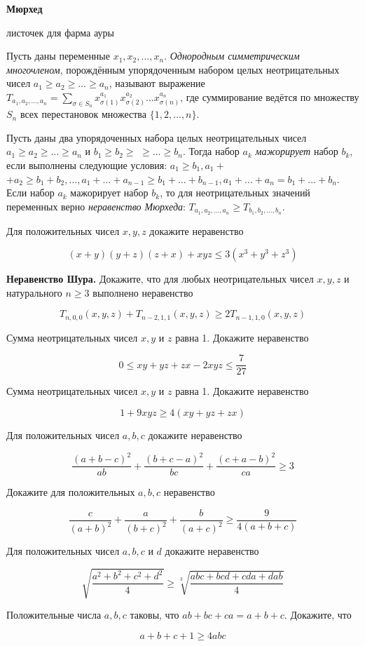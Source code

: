 \centerline{\bf \Huge Мюрхед}

\begin{flushright}
        \scriptsize{листочек для фарма ауры}
\end{flushright}

Пусть даны переменные $x_1, x_2, \ldots, x_n$. \textit{Однородным симметрическим многочленом}, порождённым упорядоченным набором целых неотрицательных чисел $a_1 \geqslant a_2 \geqslant \ldots \geqslant a_n$, называют выражение $T_{a_1, a_2, \ldots, a_n}=\sum_{\sigma \in S_n} x_{\sigma(1)}^{a_1} x_{\sigma(2)}^{a_2} \ldots x_{\sigma(n)}^{a_n}$, где суммирование ведётся по множеству $S_n$ всех перестановок множества $\{1,2, \ldots, n\}$.

Пусть даны два упорядоченных набора целых неотрицательных чисел $a_1 \geqslant a_2 \geqslant \ldots \geqslant a_n$ и $b_1 \geqslant b_2 \geqslant$ $\geqslant \ldots \geqslant b_n$. Тогда набор $a_k$ \textit{мажорирует} набор $b_k$, если выполнены следующие условия: $a_1 \geqslant b_1, a_1+$ $+a_2 \geqslant b_1+b_2, \ldots, a_1+\ldots+a_{n-1} \geqslant b_1+\ldots+b_{n-1}, a_1+\ldots+a_n=b_1+\ldots+b_n$. Если набор $a_k$ мажорирует набор $b_k$, то для неотрицательных значений переменных верно \textit{неравенство Мюрхеда}: $T_{a_1, a_2, \ldots, a_n} \geqslant T_{b_1, b_2, \ldots, b_n}$.

Для положительных чисел $x, y, z$ докажите неравенство

$$
(x+y)(y+z)(z+x)+x y z \leqslant 3\left(x^3+y^3+z^3\right)
$$

\textbf{Неравенство Шура.} Докажите, что для любых неотрицательных чисел $x, y, z$ и натурального $n \geqslant 3$ выполнено неравенство

$$
T_{n, 0,0}(x, y, z)+T_{n-2,1,1}(x, y, z) \geqslant 2 T_{n-1,1,0}(x, y, z)
$$

Сумма неотрицательных чисел $x, y$ и $z$ равна 1. Докажите неравенство

$$
0 \leqslant x y+y z+z x-2 x y z \leqslant \frac{7}{27}
$$


Сумма неотрицательных чисел $x, y$ и $z$ равна 1. Докажите неравенство

$$
1+9 x y z \geqslant 4(x y+y z+z x)
$$

Для положительных чисел $a, b, c$ докажите неравенство

$$
\frac{(a+b-c)^2}{a b}+\frac{(b+c-a)^2}{b c}+\frac{(c+a-b)^2}{c a} \geqslant 3
$$

Докажите для положительных $a, b, c$ неравенство

$$
\frac{c}{(a+b)^2}+\frac{a}{(b+c)^2}+\frac{b}{(a+c)^2} \geqslant \frac{9}{4(a+b+c)}
$$

Для положительных чисел $a, b, c$ и $d$ докажите неравенство

$$
\sqrt{\frac{a^2+b^2+c^2+d^2}{4}} \geqslant \sqrt[3]{\frac{a b c+b c d+c d a+d a b}{4}}
$$

Положительные числа $a, b, c$ таковы, что $a b+b c+c a=a+b+c$. Докажите, что

$$
a+b+c+1 \geqslant 4 a b c
$$